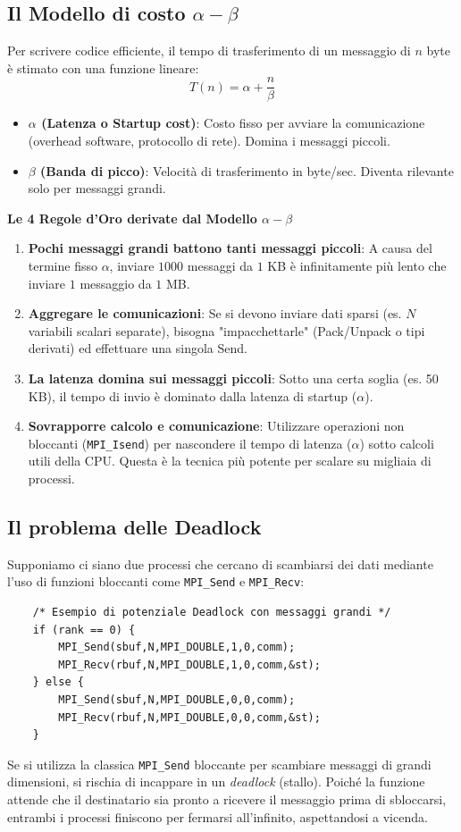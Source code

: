 \subsection{Il Modello di costo $\alpha - \beta$}
Per scrivere codice efficiente, il tempo di trasferimento di un messaggio di $n$ byte è stimato con una funzione lineare:
$$T(n) = \alpha + \frac{n}{\beta}$$
\begin{itemize}
    \item \textbf{$\alpha$ (Latenza o Startup cost)}: Costo fisso per avviare la comunicazione (overhead software, protocollo di rete). Domina i messaggi piccoli.
    \item \textbf{$\beta$ (Banda di picco)}: Velocità di trasferimento in byte/sec. Diventa rilevante solo per messaggi grandi.
\end{itemize}

\begin{framed}
\noindent
\textbf{Le 4 Regole d'Oro derivate dal Modello $\alpha-\beta$}
\begin{enumerate}
    \item \textbf{Pochi messaggi grandi battono tanti messaggi piccoli}: A causa del termine fisso $\alpha$, inviare $1000$ messaggi da $1$ KB è infinitamente più lento che inviare $1$ messaggio da $1$ MB.
    \item \textbf{Aggregare le comunicazioni}: Se si devono inviare dati sparsi (es. $N$ variabili scalari separate), bisogna "impacchettarle" (Pack/Unpack o tipi derivati) ed effettuare una singola Send.
    \item \textbf{La latenza domina sui messaggi piccoli}: Sotto una certa soglia (es. 50 KB), il tempo di invio è dominato dalla latenza di startup ($\alpha$).
    \item \textbf{Sovrapporre calcolo e comunicazione}: Utilizzare operazioni non bloccanti (\texttt{MPI\_Isend}) per nascondere il tempo di latenza ($\alpha$) sotto calcoli utili della CPU. Questa è la tecnica più potente per scalare su migliaia di processi.
\end{enumerate}
\end{framed}

\subsection{Il problema delle Deadlock}
Supponiamo ci siano due processi che cercano di scambiarsi dei dati mediante l'uso di funzioni bloccanti come \texttt{MPI\_Send} e \texttt{MPI\_Recv}:
\begin{verbatim}
    /* Esempio di potenziale Deadlock con messaggi grandi */
    if (rank == 0) {
        MPI_Send(sbuf,N,MPI_DOUBLE,1,0,comm);
        MPI_Recv(rbuf,N,MPI_DOUBLE,1,0,comm,&st);
    } else {
        MPI_Send(sbuf,N,MPI_DOUBLE,0,0,comm);
        MPI_Recv(rbuf,N,MPI_DOUBLE,0,0,comm,&st);
    }
\end{verbatim}
Se si utilizza la classica \texttt{MPI\_Send} bloccante per scambiare messaggi di grandi dimensioni, si rischia di incappare in un \textit{deadlock} (stallo). Poiché la funzione attende che il destinatario sia pronto a ricevere il messaggio prima di sbloccarsi, entrambi i processi finiscono per fermarsi all'infinito, aspettandosi a vicenda. 

